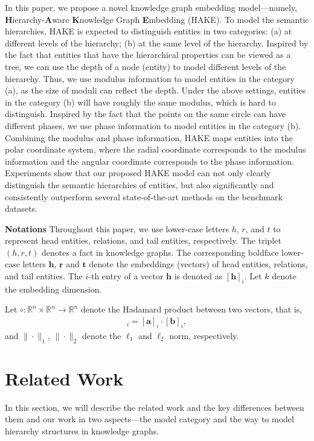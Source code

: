 \documentclass[letterpaper]{article} \usepackage{aaai20}  \usepackage{times}  \usepackage{helvet} \usepackage{courier}  \usepackage[hyphens]{url}  \usepackage{graphicx} \urlstyle{rm} \def\UrlFont{\rm}  \usepackage{graphicx}  \frenchspacing  \setlength{\pdfpagewidth}{8.5in}  \setlength{\pdfpageheight}{11in}
\begin{document}
In this paper, we propose a novel knowledge graph embedding model---namely, \textbf{H}ierarchy-\textbf{A}ware \textbf{K}nowledge Graph \textbf{E}mbedding (HAKE). To model the semantic hierarchies, HAKE is expected to distinguish entities in two categories: (a) at different levels of the hierarchy; (b) at the same level of the hierarchy. Inspired by the fact that entities that have the hierarchical properties can be viewed as a tree, we can use the depth of a node (entity) to model different levels of the hierarchy. Thus, we use modulus information to model entities in the category (a), as the size of moduli can reflect the depth. Under the above settings, entities in the category (b) will have roughly the same modulus, which is hard to distinguish. Inspired by the fact that the points on the same circle can have different phases, we use phase information to model entities in the category (b). Combining the modulus and phase information, HAKE maps entities into the polar coordinate system, where the radial coordinate corresponds to the modulus information and the angular coordinate corresponds to the phase information.
Experiments show that our proposed HAKE model can not only clearly distinguish the semantic hierarchies of entities, but also significantly and consistently outperform several state-of-the-art methods on the benchmark datasets.


\vspace{3mm}
\noindent
\textbf{Notations} Throughout this paper, we use lower-case letters $h$, $r$, and $t$ to represent head entities, relations, and tail entities, respectively. The triplet $(h,r,t)$ denotes a fact in knowledge graphs. The corresponding boldface lower-case letters $\textbf{h}$, $\textbf{r}$ and $\textbf{t}$ denote the embeddings (vectors) of head entities, relations, and tail entities. The $i$-th entry of a vector $\textbf{h}$ is denoted as $[\textbf{h}]_i$. 
Let $k$ denote the embedding dimension.

Let $\circ:\mathbb{R}^n\times\mathbb{R}^n\rightarrow\mathbb{R}^n$ denote the Hadamard product between two vectors, that is,
\begin{align*}
    [\textbf{a}\circ \textbf{b}]_i=[\textbf{a}]_i\cdot [\textbf{b}]_i,
\end{align*}
and $\|\cdot\|_1$, $\|\cdot\|_2$ denote the $\ell_1$ and $\ell_2$ norm, respectively. 


\section{Related Work}
In this section, we will describe the related work and the key differences between them and our work in two aspects---the model category and the way to model hierarchy structures in knowledge graphs.
\end{document}

